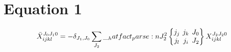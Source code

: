 \documentclass{scrartcl}
\newcommand{\sixj}[6]{\begingroup\setlength{\arraycolsep}{0.2em}\begin{Bmatrix} #1 & #2 & #3 \\ #4 & #5 & #6 \end{Bmatrix}\endgroup}
\begin{document}
\section{Equation 1}
\begin{dmath*}
\bar{X}_{i j k l}^{{J}_{0} {J}_{1} 0} = -\delta_{{J}_{1},{J}_{0}} \* \sum_{{J}_{2}} \* \hatfact{{J}_{2}^{2}} \* \sixj{{j}_{j}}{{j}_{k}}{{J}_{0}}{{j}_{l}}{{j}_{i}}{{J}_{2}} \* X_{i j k l}^{{J}_{2} {J}_{2} 0}
\end{dmath*}
\end{document}
